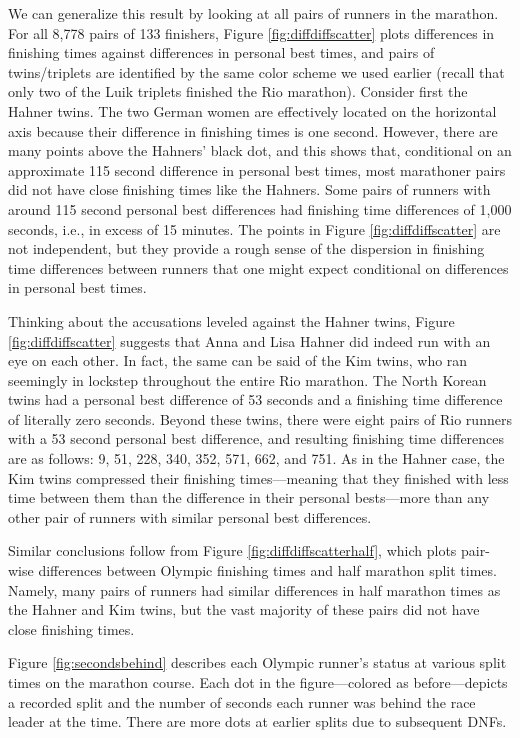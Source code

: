 \documentclass[12pt,titlepage]{article}
\begin{document}
We can generalize this result by looking at all pairs of runners in
the marathon.  For all 8,778 pairs of 133 finishers, Figure
\ref{fig:diffdiffscatter} plots differences in finishing times against
differences in personal best times, and pairs of twins/triplets are
identified by the same color scheme we used earlier (recall that only
two of the Luik triplets finished the Rio marathon).  Consider first
the Hahner twins.  The two German women are effectively located on the
horizontal axis because their difference in finishing times is one
second.  However, there are many points above the Hahners' black dot,
and this shows that, conditional on an approximate 115 second
difference in personal best times, most marathoner pairs did not have
close finishing times like the Hahners.  Some pairs of runners with
around 115 second personal best differences had finishing time
differences of 1,000 seconds, i.e., in excess of 15 minutes.  The
points in Figure \ref{fig:diffdiffscatter} are not independent, but
they provide a rough sense of the dispersion in finishing time
differences between runners that one might expect conditional on
differences in personal best times.

Thinking about the accusations leveled against the Hahner twins,
Figure \ref{fig:diffdiffscatter} suggests that Anna and Lisa Hahner
did indeed run with an eye on each other.  In fact, the same can be
said of the Kim twins, who ran seemingly in lockstep throughout the
entire Rio marathon.  The North Korean twins had a personal best
difference of 53 seconds and a finishing time difference of literally
zero seconds.  Beyond these twins, there were eight pairs of Rio
runners with a 53 second personal best difference, and resulting
finishing time differences are as follows: 9, 51, 228, 340, 352, 571,
662, and 751.  As in the Hahner case, the Kim twins compressed their
finishing times---meaning that they finished with less time between
them than the difference in their personal bests---more than any other
pair of runners with similar personal best differences.

Similar conclusions follow from Figure \ref{fig:diffdiffscatterhalf},
which plots pair-wise differences between Olympic finishing times and
half marathon split times.  Namely, many pairs of runners had similar
differences in half marathon times as the Hahner and Kim twins, but
the vast majority of these pairs did not have close finishing times.

Figure \ref{fig:secondsbehind} describes each Olympic runner's status
at various split times on the marathon course.  Each dot in the
figure---colored as before---depicts a recorded split and the number of
seconds each runner was behind the race leader at the time.  There are
more dots at earlier splits due to subsequent DNFs. 
\end{document}
